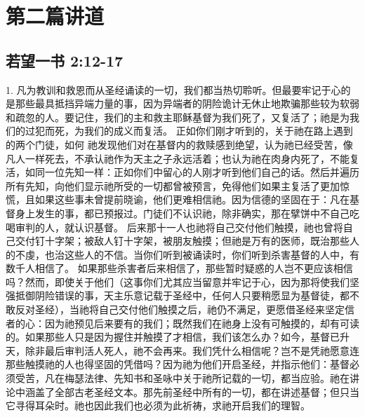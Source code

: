 \section{第二篇讲道}


\subsection{若望一书 2:12-17}

\par

1. 凡为教训和救恩而从圣经诵读的一切，我们都当热切聆听。但最要牢记于心的是那些最具抵挡异端力量的事，因为异端者的阴险诡计无休止地欺骗那些较为软弱和疏忽的人。要记住，我们的主和救主耶稣基督为我们死了，又复活了；祂是为我们的过犯而死，为我们的成义而复活。 正如你们刚才听到的，关于祂在路上遇到的两个门徒，如何 祂发现他们对在基督内的救赎感到绝望，认为祂已经受苦，像凡人一样死去，不承认祂作为天主之子永远活着；也认为祂在肉身内死了，不能复活，如同一位先知一样：正如你们中留心的人刚才听到他们自己的话。然后并遍历所有先知，向他们显示祂所受的一切都曾被预言，免得他们如果主复活了更加惊慌，且如果这些事未曾提前晓谕，他们更难相信祂。因为信德的坚固在于：凡在基督身上发生的事，都已预报过。门徒们不认识祂，除非确实，那在擘饼中不自己吃喝审判的人，就认识基督。 后来那十一人也祂将自己交付他们触摸，祂也曾将自己交付钉十字架；被敌人钉十字架，被朋友触摸；但祂是万有的医师，既治那些人的不虔，也治这些人的不信。当你们听到被诵读时，你们听到杀害基督的人中，有数千人相信了。 如果那些杀害者后来相信了，那些暂时疑惑的人岂不更应该相信吗？然而，即使关于他们（这事你们尤其应当留意并牢记于心，因为那将使我们坚强抵御阴险错误的事，天主乐意记载于圣经中，任何人只要稍愿显为基督徒，都不敢反对圣经），当祂将自己交付他们触摸之后，祂仍不满足，更愿借圣经来坚定信者的心：因为祂预见后来要有的我们；既然我们在祂身上没有可触摸的，却有可读的。如果那些人只是因为握住并触摸了才相信，我们该怎么办？如今，基督已升天，除非最后审判活人死人，祂不会再来。我们凭什么相信呢？岂不是凭祂愿意连那些触摸祂的人也得坚固的凭借吗？因为祂为他们开启圣经，并指示他们：基督必须受苦，凡在梅瑟法律、先知书和圣咏中关于祂所记载的一切，都当应验。祂在讲论中涵盖了全部古老圣经文本。那先前圣经中所有的一切，都在讲述基督；但只当它寻得耳朵时。祂也因此我们也必须为此祈祷，求祂开启我们的理智。\par

